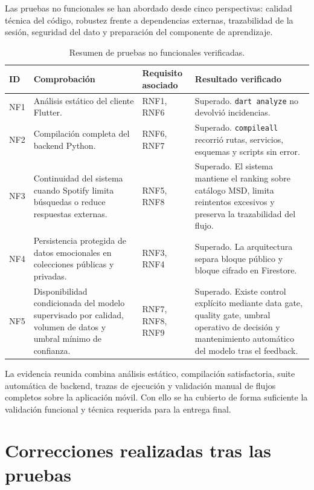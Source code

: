 Las pruebas no funcionales se han abordado desde cinco perspectivas: calidad
técnica del código, robustez frente a dependencias externas, trazabilidad de la
sesión, seguridad del dato y preparación del componente de aprendizaje.

\begin{table}[H]
\centering
\small
\renewcommand{\arraystretch}{1.1}
\begin{tabularx}{\textwidth}{|P{1.4cm}|Y|P{2.8cm}|P{3.1cm}|}
\hline
\textbf{ID} & \textbf{Comprobación} & \textbf{Requisito asociado} & \textbf{Resultado verificado} \\
\hline
NF1 & Análisis estático del cliente Flutter. & RNF1, RNF6 & Superado. \texttt{dart analyze} no devolvió incidencias. \\
\hline
NF2 & Compilación completa del backend Python. & RNF6, RNF7 & Superado. \texttt{compileall} recorrió rutas, servicios, esquemas y scripts sin error. \\
\hline
NF3 & Continuidad del sistema cuando Spotify limita búsquedas o reduce respuestas externas. & RNF5, RNF8 & Superado. El sistema mantiene el ranking sobre catálogo MSD, limita reintentos excesivos y preserva la trazabilidad del flujo. \\
\hline
NF4 & Persistencia protegida de datos emocionales en colecciones públicas y privadas. & RNF3, RNF4 & Superado. La arquitectura separa bloque público y bloque cifrado en Firestore. \\
\hline
NF5 & Disponibilidad condicionada del modelo supervisado por calidad, volumen de datos y umbral mínimo de confianza. & RNF7, RNF8, RNF9 & Superado. Existe control explícito mediante data gate, quality gate, umbral operativo de decisión y mantenimiento automático del modelo tras el feedback. \\
\hline
\end{tabularx}
\caption{Resumen de pruebas no funcionales verificadas.}
\label{tab:pruebas_no_funcionales}
\end{table}

La evidencia reunida combina análisis estático, compilación satisfactoria,
suite automática de backend, trazas de ejecución y validación manual de flujos
completos sobre la aplicación móvil. Con ello se ha cubierto de forma
suficiente la validación funcional y técnica requerida para la entrega final.

\section{Correcciones realizadas tras las pruebas}
\label{sec:correcciones_pruebas}

